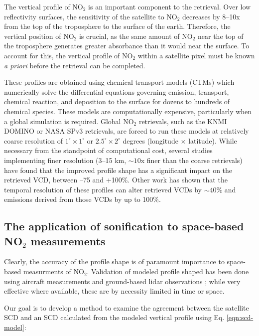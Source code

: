 \documentclass[a4paper,10pt,oneside]{article}
\newcommand{\ce}[1]{$\mathrm{#1}$}
\begin{document}
\begin{sloppy}
The vertical profile of \ce{NO_2} is an important component to the retrieval. Over low reflectivity surfaces, the sensitivity of the satellite to \ce{NO_2} decreases by 8--10x from the top of the troposphere to the surface of the earth.  Therefore, the vertical position of \ce{NO_2} is crucial, as the same amount of \ce{NO_2} near the top of the troposphere generates greater absorbance than it would near the surface. To account for this, the vertical profile of \ce{NO_2} within a satellite pixel must be known \emph{a priori} before the retrieval can be completed.

These profiles are obtained using chemical transport models (CTMs) which numerically solve the differential equations governing emission, transport, chemical reaction, and deposition to the surface for dozens to hundreds of chemical species. These models are computationally expensive, particularly when a global simulation is required. Global \ce{NO_2} retrievals, such as the KNMI DOMINO or NASA SPv3 retrievals, are forced to run these models at relatively coarse resolution of $1^\circ \times 1^\circ$ or $2.5^\circ \times 2^\circ$ degrees (longitude $\times$ latitude).  While necessary from the standpoint of computational cost, several studies implementing finer resolution (3--15 km, $\sim 10$x finer than the coarse retrievals) \cite{mclinden14, russell11, kuhlmann15} have found that the improved profile shape has a significant impact on the retrieved VCD, between --75 and +100\%.  Other work \cite{laughner16} has shown that the temporal resolution of these profiles can alter retrieved VCDs by $\sim 40\%$ and emissions derived from those VCDs by up to 100\%.

\subsection{The application of sonification to space-based NO$_2$ measurements}

Clearly, the accuracy of the profile shape is of paramount importance to space-based measurments of \ce{NO_2}. Validation of modeled profile shaped has been done using aircraft measurements \cite{lamsal14} and ground-based lidar observations \cite{volten09}; while very effective where available, these are by necessity limited in time or space. 

Our goal is to develop a method to examine the agreement between the satellite SCD and an SCD calculated from the modeled vertical profile using Eq. \eqref{eqn:scd-model}:


\end{sloppy}
\end{document}
